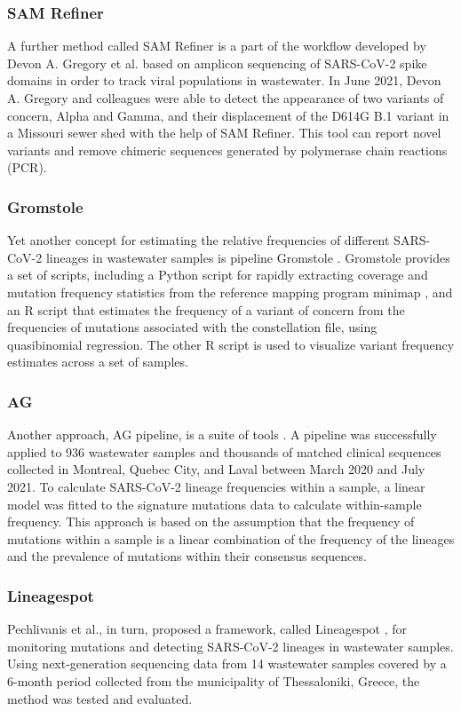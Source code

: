         \subsubsection{SAM Refiner}
        A further method called SAM Refiner is a part of the workflow developed by Devon A. Gregory et al. \cite{gregory2021} based on amplicon sequencing of SARS-CoV-2 spike domains in order to track viral populations in wastewater. In June 2021, Devon A. Gregory and colleagues were able to detect the appearance of two variants of concern, Alpha and Gamma, and their displacement of the D614G B.1 variant in a Missouri sewer shed with the help of SAM Refiner. This tool can report novel variants and remove chimeric sequences generated by polymerase chain reactions (PCR). 
        \subsubsection{Gromstole}
        Yet another concept for estimating the relative frequencies of different SARS-CoV-2 lineages in wastewater samples is pipeline Gromstole \cite{gromstole2022}. Gromstole provides a set of scripts, including a Python script for rapidly extracting coverage and mutation frequency statistics from the reference mapping program minimap \cite{li2018}, and an R script that estimates the frequency of a variant of concern from the frequencies of mutations associated with the constellation file, using quasibinomial regression. The other R script is used to visualize variant frequency estimates across a set of samples.
        \subsubsection{AG}
        Another approach, AG pipeline, is a suite of tools \cite{nguessan2022}. A pipeline was successfully applied to 936 wastewater samples and thousands of matched clinical sequences collected in Montreal, Quebec City, and Laval between March 2020 and July 2021. To calculate SARS-CoV-2 lineage frequencies within a sample, a linear model was fitted to the signature mutations data to calculate within-sample frequency. This approach is based on the assumption that the frequency of mutations within a sample is a linear combination of the frequency of the lineages and the prevalence of mutations within their consensus sequences. 
        \subsubsection{Lineagespot}
        Pechlivanis et al., in turn, proposed a framework, called Lineagespot \cite{pechlivanis2022}, for monitoring mutations and detecting SARS-CoV-2 lineages in wastewater samples. Using next-generation sequencing data from 14 wastewater samples covered by a 6-month period collected from the municipality of Thessaloniki, Greece, the method was tested and evaluated. 


